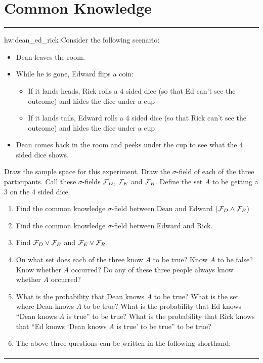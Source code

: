 \documentclass[14pt]{extarticle}
\newenvironment{textHW}{
  \noindent\rule{\textwidth}{1pt}%
  \begin{list}{}{
      \setlength{\labelwidth}{1cm}
      \setlength{\labelsep}{0.3cm}
      \setlength{\leftmargin}{1.3cm}
      \setlength{\rightmargin}{1cm}
      \setlength{\parsep}{0.5ex plus0.2ex minus0.1ex}
      \setlength{\topsep}{1pt plus3pt minus1pt}
      \setlength{\itemsep}{0ex plus0.2ex} 
      \renewcommand{\makelabel}[1]{\label{thw:##1}{\ref{##1}}}
      \sl}}%
  {\end{list}\rule{\textwidth}{1pt}}
\begin{document}
    \section{Common Knowledge}


\begin{textHW}
\item[hw:dean_ed_rick] 
Consider the following scenario:
\begin{itemize}
\item Dean leaves the room.
\item While he is gone, Edward flips a coin: 
  \begin{itemize}
  \item If it lands heads, Rick rolls a 4 sided dice (so that Ed can't
    see the outcome) and hides the dice under a cup
  \item If it lands tails, Edward rolls a 4 sided dice (so that Rick
    can't see the outcome) and hides the dice under a cup
  \end{itemize}
\item Dean comes back in the room and peeks under the cup to see what
  the 4 sided dice shows.
\end{itemize}
Draw the sample space for this experiment.  Draw the $\sigma$-field
of each of the three participants.  Call these $\sigma$-fields
${\cal F}_D$, ${\cal F}_E$ and ${\cal F}_R$.  Define the set $A$ to be
getting a 3 on the 4 sided dice.
\begin{enumerate}
\item Find the common knowledge $\sigma$-field between Dean and
  Edward (${\cal F}_D \wedge {\cal F}_E$)
\item Find the common knowledge $\sigma$-field between Edward and
  Rick. 
\item Find ${\cal F}_D \vee {\cal F}_E$ and ${\cal F}_E \vee {\cal
    F}_R$.
\item On what set does each of the three know $A$ to be true?  Know
  $A$ to be false?  Know whether $A$ occurred? Do any of these
  three people always know whether $A$ occurred?
\item What is the probability that Dean knows $A$ to be true?  What is
  the set where Dean knows $A$ to be true?  What is the probability
  that Ed knows ``Dean knows $A$ is true'' to be true?   What is the
  probability that Rick knows that ``Ed knows `Dean knows $A$ is
  true' to be true'' to be true?
\item The above three questions can be written in the following shorthand:
  \begin{eqnarray*}

\end{eqnarray*}
\end{enumerate}
\end{textHW}
\end{document}
